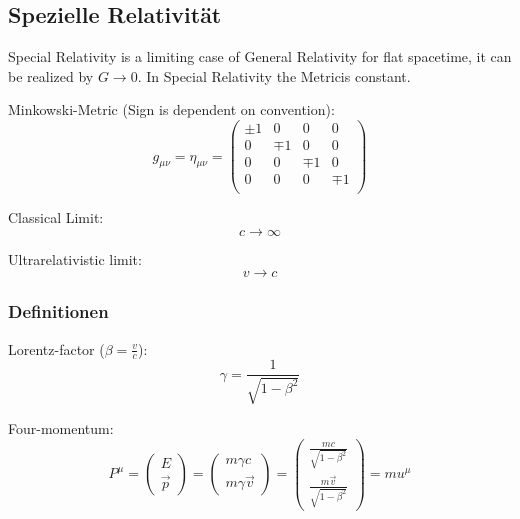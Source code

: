 	\subsection{Spezielle Relativität}
		\noindent
		Special Relativity is a limiting case of General Relativity for flat spacetime, it can be realized by $G \rightarrow 0$. In Special Relativity the Metricis constant.%

		\noindent
		Minkowski-Metric (Sign is dependent on convention):
		\begin{equation}
			g_{\mu\nu} = \eta_{\mu\nu}
			= \left( \begin{matrix}
				\pm1 & 0		& 0		& 0		\\
				0		& \mp1 & 0		& 0		\\
				0		& 0		& \mp1 & 0		\\
				0		& 0		& 0		& \mp1 \\
			\end{matrix} \right)
		\end{equation}

		\noindent
		Classical Limit:
		\begin{equation}
			c \rightarrow \infty
		\end{equation}

		\noindent
		Ultrarelativistic limit:
		\begin{equation}
			v\rightarrow c
		\end{equation}

		\subsubsection{Definitionen}
			\noindent
			Lorentz-factor ($\beta = \frac{v}{c}$):
			\begin{equation}
				\gamma = \frac{1}{\sqrt{1-\beta^2}}
			\end{equation}

			\noindent
			Four-momentum:
			\begin{equation}
				P^\mu =
				\left(\begin{matrix}
					E \\ \vec{p}
				\end{matrix}\right)
				= \left(\begin{matrix}
					m\gamma c \\ m\gamma\vec{v}
				\end{matrix}\right)
				= \left(\begin{matrix}
					\frac{mc}{\sqrt{1-\beta^2}} \\ \frac{m\vec{v}}{\sqrt{1-\beta^2}}
				\end{matrix}\right)
				= m u^\mu
			\end{equation}

